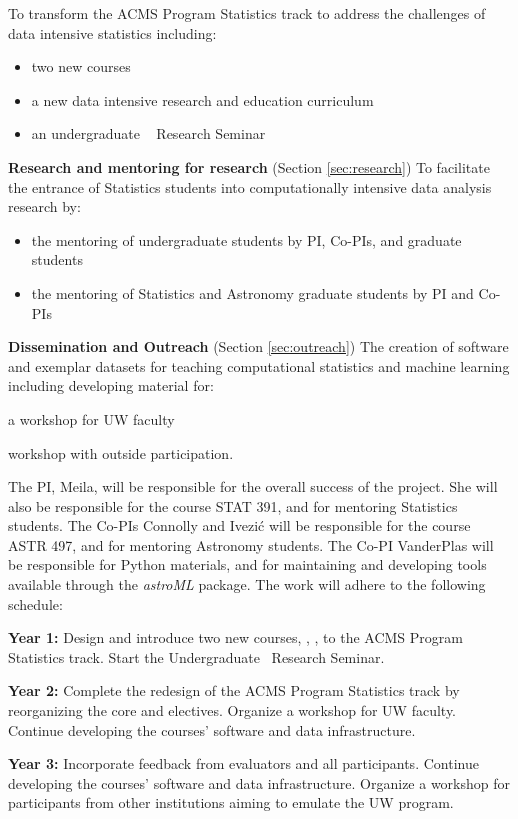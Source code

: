   To transform the ACMS Program Statistics track to address the
  challenges of data intensive statistics including:
\begin{itemize}
  \item two new courses
  \item a  new data intensive research and education curriculum 
  \item an undergraduate \cdse~ Research Seminar
  \end{itemize}
\item {\bf Research and mentoring for research} (Section \ref{sec:research})
To facilitate the entrance of Statistics students into computationally
intensive data analysis research by:
\begin{itemize}
  \item the mentoring of undergraduate students by PI, Co-PIs, and graduate students
  \item the mentoring of Statistics and Astronomy graduate students by PI and Co-PIs
  \end{itemize}
\item {\bf Dissemination and Outreach} (Section \ref{sec:outreach})
 The creation of software and exemplar datasets for teaching
 computational statistics and machine learning including developing
 material for:
 \bits
  \item a workshop for UW faculty %
  \item workshop with outside participation. 
 \eits
\eits  

The PI, Meila, will be responsible for the overall success of the project. She will also be 
responsible for the course STAT 391, and for mentoring Statistics students. The Co-PIs 
Connolly and Ivezi\'{c} will be responsible for the course ASTR 497, and for mentoring 
Astronomy students. The Co-PI VanderPlas will be responsible for Python materials, 
and for maintaining and developing tools available through the {\it
  astroML} package.  The work will adhere to the following schedule: 
\bits
\item {\bf  Year 1:} Design and introduce two new courses, \statcl, \astrocl, to
the ACMS Program Statistics track. Start the Undergraduate \cdse\ Research Seminar. 
\item {\bf Year 2:} Complete the redesign of the ACMS Program Statistics track
by reorganizing the core and electives. Organize a workshop for UW faculty. 
Continue developing the courses' software and data infrastructure. 
\item {\bf Year 3:} Incorporate feedback from evaluators and all participants. 
Continue developing the courses' software and data infrastructure. 
Organize a workshop for participants from other institutions aiming to 
emulate the UW program.
\eits

